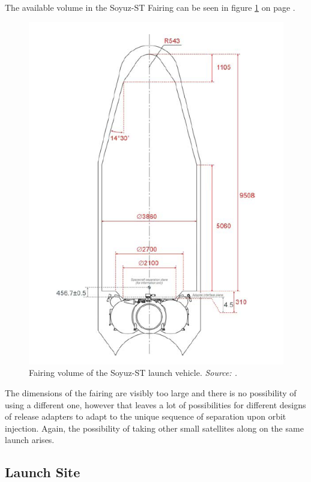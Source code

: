 The available volume in the Soyuz-ST Fairing can be seen in figure \ref{fig:soyuzvol} on page \pageref{fig:soyuzvol}.

\begin{figure}[!h]
\centering
\includegraphics[scale = 0.5, angle=0]{chapters/img/soyuzvol.png}
\caption{Fairing volume of the Soyuz-ST launch vehicle.\emph{ Source: \cite{soyuzman}.}}
\label{fig:soyuzvol}
\end{figure} 

The dimensions of the fairing are visibly too large and there is no possibility of using a different one, however that leaves a lot of possibilities for different designs of release adapters to adapt to the unique sequence of separation upon orbit injection. Again, the possibility of taking other small satellites along on the same launch arises.  

\subsection{Launch Site}
\label{frLSLS}

